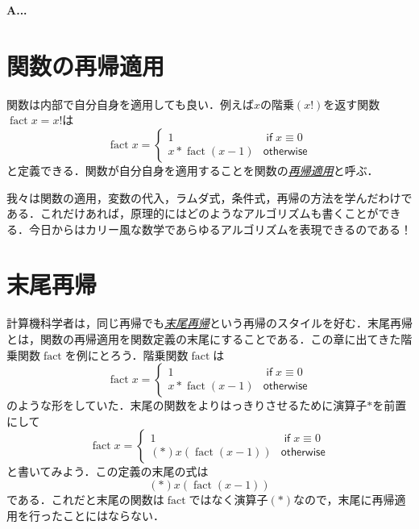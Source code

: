 \documentclass[a5paper,draft]{jsbook}
\newenvironment{leader}{\begingroup\bf}{\endgroup}
\newcommand{\keyword}[1]{{\underline{\emph{#1}}}}
\DeclareMathOperator{\mathFactorial}{fact}
\newcommand{\mathKeyword}[1]{\operatorname{\textsf{#1}}}
\newcommand{\mathIf}{\mathKeyword{if}}
\newcommand{\mathOtherwise}{\mathKeyword{otherwise}}
\begin{document}
\begin{leader}
A...
\end{leader}


\section{関数の再帰適用}

関数は内部で自分自身を適用しても良い．例えば$x$の階乗$(x!)$を返す関数$\mathFactorial x=x!$は
\begin{equation}
\mathFactorial x=\begin{cases}
1&\mathIf x\equiv0\\
x*\mathFactorial(x-1)&\mathOtherwise
\end{cases}
\end{equation}
と定義できる．関数が自分自身を適用することを関数の\keyword{再帰適用}と呼ぶ．

我々は関数の適用，変数の代入，ラムダ式，条件式，再帰の方法を学んだわけである．これだけあれば，原理的にはどのようなアルゴリズムも書くことができる．今日からはカリー風な数学であらゆるアルゴリズムを表現できるのである！

\section{末尾再帰}

計算機科学者は，同じ再帰でも\keyword{末尾再帰}という再帰のスタイルを好む．末尾再帰とは，関数の再帰適用を関数定義の末尾にすることである．この章に出てきた階乗関数$\mathFactorial$を例にとろう．階乗関数$\mathFactorial$は
\begin{equation}
\mathFactorial x=\begin{cases}
1&\mathIf x\equiv0\\
x*\mathFactorial(x-1)&\mathOtherwise
\end{cases}
\end{equation}
のような形をしていた．末尾の関数をよりはっきりさせるために演算子$*$を前置にして
\begin{equation}
\mathFactorial x=\begin{cases}
1&\mathIf x\equiv0\\
(*)x(\mathFactorial(x-1))&\mathOtherwise
\end{cases}
\end{equation}
と書いてみよう．この定義の末尾の式は
\begin{equation}
(*)x(\mathFactorial(x-1))
\end{equation}
である．これだと末尾の関数は$\mathFactorial$ではなく演算子$(*)$なので，末尾に再帰適用を行ったことにはならない．
\end{document}
